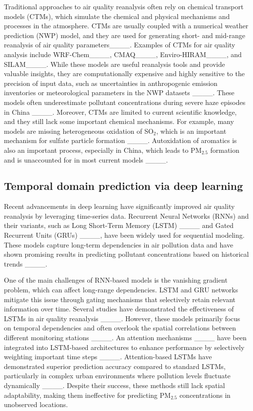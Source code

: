 Traditional approaches to air quality reanalysis often rely on chemical transport models (CTMs), which simulate the chemical and physical mechanisms and processes in the atmosphere. CTMs are usually coupled with a numerical weather prediction (NWP) model, and they are used for generating short- and mid-range reanalysis of air quality parameters____. Examples of CTMs for air quality analysis include WRF-Chem____, CMAQ____, Enviro-HIRAM____, and SILAM____. While these models are useful reanalysis tools and provide valuable insights, they are computationally expensive and highly sensitive to the precision of input data, such as uncertainties in anthropogenic emission inventories or meteorological parameters in the NWP datasets ____. These models often underestimate pollutant concentrations during severe haze episodes in China ____. Moreover, CTMs are limited to current scientific knowledge, and they still lack some important chemical mechanisms. For example, many models are missing heterogeneous oxidation of SO$_2$, which is an important mechanism for sulfate particle formation ____. Autoxidation of aromatics is also an important process, especially in China, which leads to PM$_{2.5}$ formation and is unaccounted for in most current models ____.

\subsection{Temporal domain prediction via deep learning}
Recent advancements in deep learning have significantly improved air quality reanalysis by leveraging time-series data. Recurrent Neural Networks (RNNs) and their variants, such as Long Short-Term Memory (LSTM) ____ and Gated Recurrent Units (GRUs) ____, have been widely used for sequential modeling. These models capture long-term dependencies in air pollution data and have shown promising results in predicting pollutant concentrations based on historical trends ____.

One of the main challenges of RNN-based models is the vanishing gradient problem, which can affect long-range dependencies. LSTM and GRU networks mitigate this issue through gating mechanisms that selectively retain relevant information over time. Several studies have demonstrated the effectiveness of LSTMs in air quality reanalysis ____. However, these models primarily focus on temporal dependencies and often overlook the spatial correlations between different monitoring stations ____. An attention mechanisms ____ have been integrated into LSTM-based architectures to enhance performance by selectively weighting important time steps ____. Attention-based LSTMs have demonstrated superior prediction accuracy compared to standard LSTMs, particularly in complex urban environments where pollution levels fluctuate dynamically ____. Despite their success, these methods still lack spatial adaptability, making them ineffective for predicting PM\(_{2.5}\) concentrations in unobserved locations. 

